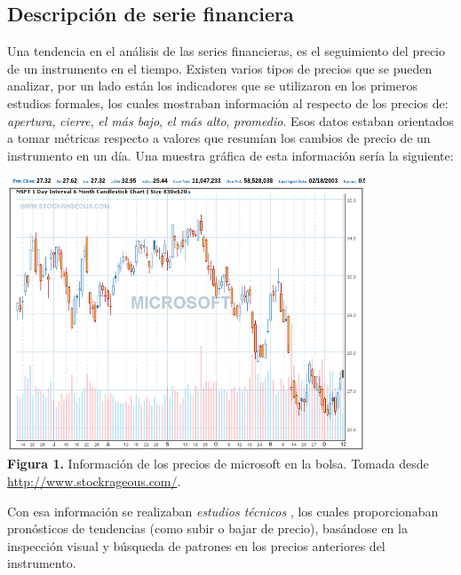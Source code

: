 \subsection{Descripción de serie financiera}

Una tendencia en el análisis de las series financieras, es el seguimiento del precio de un instrumento en el tiempo.
Existen varios tipos de precios que se pueden analizar, por un lado están los indicadores que se utilizaron en los primeros estudios formales, los cuales 
mostraban información al respecto de los precios de: \emph{apertura}, \emph{cierre}, \emph{el más bajo}, \emph{el más alto}, \emph{promedio}. Esos datos 
estaban orientados a tomar métricas respecto a valores que resumían los cambios de precio de un instrumento en un día. Una muestra gráfica de esta información sería la siguiente:

\begin{center}
	\includegraphics[width=0.8\textwidth]{images/microsoft} \\
	\textbf{Figura 1.} Información de los precios de microsoft en la bolsa. Tomada desde \url{http://www.stockrageous.com/}.
\end{center}

Con esa información se realizaban \emph{estudios técnicos} \cite{taylor1992use}, los cuales proporcionaban pronósticos de tendencias (como subir o bajar de precio), 
basándose en la inspección visual y búsqueda de patrones en los precios anteriores del instrumento. 


